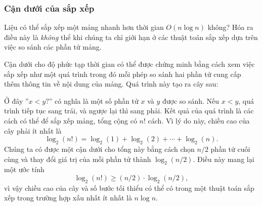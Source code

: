 \subsubsection{Cận dưới của sắp xếp}

Liệu có thể sắp xếp một mảng nhanh hơn
thời gian $O(n \log n)$ không?
Hóa ra điều này là \emph{không} thể
khi chúng ta chỉ giới hạn ở các thuật toán sắp xếp
dựa trên việc so sánh các phần tử mảng.

Cận dưới cho độ phức tạp thời gian
có thể được chứng minh bằng cách xem việc sắp xếp
như một quá trình trong đó mỗi phép so sánh hai phần tử
cung cấp thêm thông tin về nội dung của mảng.
Quá trình này tạo ra cây sau:

\begin{center}
\end{center}

Ở đây ''$x<y?$'' có nghĩa là một số phần tử
$x$ và $y$ được so sánh.
Nếu $x<y$, quá trình tiếp tục sang trái,
và ngược lại thì sang phải.
Kết quả của quá trình là các cách có thể
để sắp xếp mảng, tổng cộng có $n!$ cách.
Vì lý do này, chiều cao của cây
phải ít nhất là
\[ \log_2(n!) = \log_2(1)+\log_2(2)+\cdots+\log_2(n).\]
Chúng ta có được một cận dưới cho tổng này
bằng cách chọn $n/2$ phần tử cuối cùng và
thay đổi giá trị của mỗi phần tử thành $\log_2(n/2)$.
Điều này mang lại một ước tính
\[ \log_2(n!) \ge (n/2) \cdot \log_2(n/2),\]
vì vậy chiều cao của cây và số bước tối thiểu
có thể có trong một thuật toán sắp xếp
trong trường hợp xấu nhất
ít nhất là $n \log n$.

